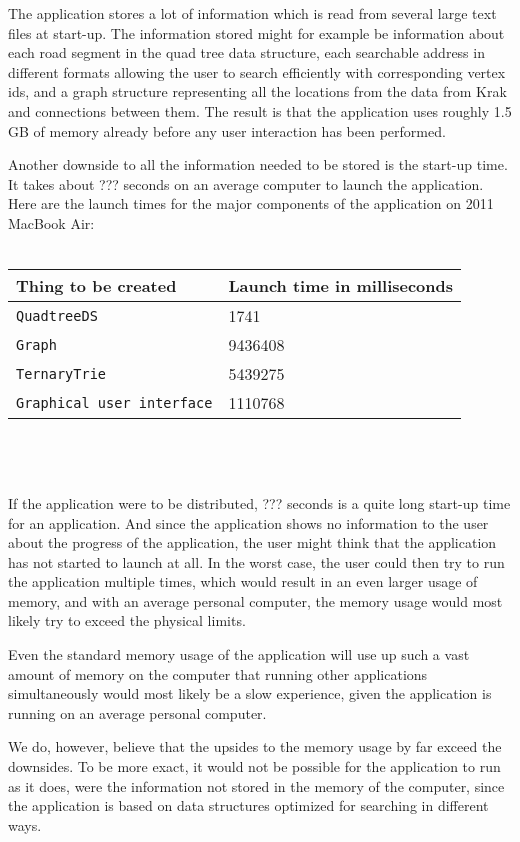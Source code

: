 The application stores a lot of information which is read from several large text files at start-up. The information stored might for example be information about each road segment in the quad tree data structure, each searchable address in different formats allowing the user to search efficiently with corresponding vertex ids, and a graph structure representing all the locations from the data from Krak and connections between them. The result is that the application uses roughly 1.5 GB of memory already before any user interaction has been performed.

Another downside to all the information needed to be stored is the start-up time. It takes about ??? seconds on an average computer to launch the application. Here are the launch times for the major components of the application on 2011 MacBook Air: \\ \\
\begin{tabular}{ p{5cm} | p{3cm} }
	\textbf{Thing to be created} & \textbf{Launch time in milliseconds} \\
	\hline
	\texttt{QuadtreeDS} & 1741 \\
	\texttt{Graph} & 9436408 \\
	\texttt{TernaryTrie} & 5439275 \\
	\texttt{Graphical user interface} & 1110768
\end{tabular}
\\ \\ \\
If the application were to be distributed, ??? seconds is a quite long start-up time for an application. And since the application shows no information to the user about the progress of the application, the user might think that the application has not started to launch at all. In the worst case, the user could then try to run the application multiple times, which would result in an even larger usage of memory, and with an average personal computer, the memory usage would most likely try to exceed the physical limits.

Even the standard memory usage of the application will use up such a vast amount of memory on the computer that running other applications simultaneously would most likely be a slow experience, given the application is running on an average personal computer.

We do, however, believe that the upsides to the memory usage by far exceed the downsides. To be more exact, it would not be possible for the application to run as it does, were the information not stored in the memory of the computer, since the application is based on data structures optimized for searching in different ways.

